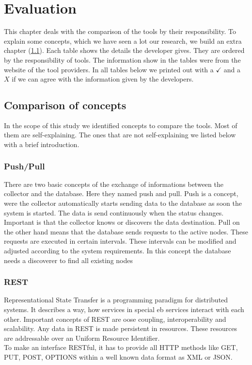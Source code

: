 \chapter{Evaluation} %
This chapter deals with the comparison of the tools by their responsibility. To explain some concepts, which we have seen a lot our research, we build an extra chapter (\cref{concepts}).
Each table shows the details the developer gives. They are ordered by the responsibility of tools. The information show in the tables were from the website of the tool providers.
In all tables below we printed out with a $ \checkmark $ and a $ X $ if we can agree with the information given by the developers.
\section{Comparison of concepts}
\label{concepts}
In the scope of this study we identified concepts to compare the tools. Most of them are self-explaining. The ones that are not self-explaining we listed below with a brief introduction.
\subsection{Push/Pull}
\label{push/pull}
There are two basic concepts of the exchange of informations between the collector and the database. Here they named push and pull. Push \cite{5557986} is a concept, were the collector  automatically starts sending data to the database as soon the system is started. The data is send continuously when the status changes. Important is that the collector knows or discovers the data destination.
Pull \cite{5557986} on the other hand means that the database sends requests to the active nodes. These requests are executed in certain intervals. These intervals can be modified and adjusted according to the system requirements. In this concept the database needs a discoverer to find all existing nodes
\subsection{REST}
\label{rest}
Representational State Transfer is a programming paradigm for distributed systems. It describes a way, how services in special eb services interact with each other. Important concepts of REST are oose coupling, interoperability and scalability. Any data in REST is made persistent in resources. These resources are addressable over an Uniform Resource Identifier. \\
To make an interface RESTful, it has to provide all HTTP methods like GET, PUT, POST, OPTIONS within a well known data format as XML or JSON.


